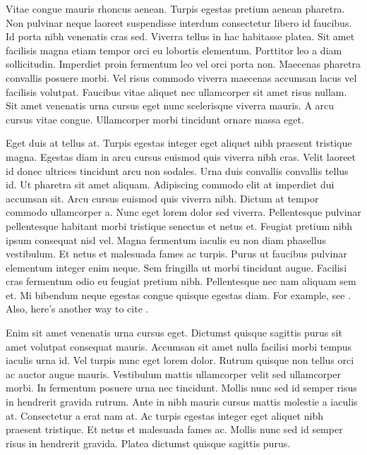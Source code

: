 Vitae congue mauris rhoncus aenean. Turpis egestas pretium aenean pharetra.
Non pulvinar neque laoreet suspendisse interdum consectetur libero id
faucibus. Id porta nibh venenatis cras sed. Viverra tellus in hac habitasse
platea. Sit amet facilisis magna etiam tempor orci eu lobortis elementum.
Porttitor leo a diam sollicitudin. Imperdiet proin fermentum leo vel orci
porta non. Maecenas pharetra convallis posuere morbi. Vel risus commodo
viverra maecenas accumsan lacus vel facilisis volutpat. Faucibus vitae
aliquet nec ullamcorper sit amet risus nullam. Sit amet venenatis urna cursus
eget nunc scelerisque viverra mauris. A arcu cursus vitae congue. Ullamcorper
morbi tincidunt ornare massa eget.
%


Eget duis at tellus at. Turpis egestas integer eget aliquet nibh praesent
tristique magna. Egestas diam in arcu cursus euismod quis viverra nibh cras.
Velit laoreet id donec ultrices tincidunt arcu non sodales. Urna duis
convallis convallis tellus id. Ut pharetra sit amet aliquam. Adipiscing
commodo elit at imperdiet dui accumsan sit. Arcu cursus euismod quis viverra
nibh. Dictum at tempor commodo ullamcorper a. Nunc eget lorem dolor sed
viverra. Pellentesque pulvinar pellentesque habitant morbi tristique senectus
et netus et. Feugiat pretium nibh ipsum consequat nisl vel. Magna fermentum
iaculis eu non diam phasellus vestibulum. Et netus et malesuada fames ac
turpis. Purus ut faucibus pulvinar elementum integer enim neque. Sem
fringilla ut morbi tincidunt augue. Facilisi cras fermentum odio eu feugiat
pretium nibh. Pellentesque nec nam aliquam sem et. Mi bibendum neque egestas
congue quisque egestas diam. For example, see \citet{fama1992cross}. Also, here's another
way to cite \citep{sharpe1964capital}.


Enim sit amet venenatis urna cursus eget. Dictumst quisque sagittis purus sit
amet volutpat consequat mauris. Accumsan sit amet nulla facilisi morbi tempus
iaculis urna id. Vel turpis nunc eget lorem dolor. Rutrum quisque non tellus
orci ac auctor augue mauris. Vestibulum mattis ullamcorper velit sed
ullamcorper morbi. In fermentum posuere urna nec tincidunt. Mollis nunc sed
id semper risus in hendrerit gravida rutrum. Ante in nibh mauris cursus
mattis molestie a iaculis at. Consectetur a erat nam at. Ac turpis egestas
integer eget aliquet nibh praesent tristique. Et netus et malesuada fames ac.
Mollis nunc sed id semper risus in hendrerit gravida. Platea dictumst quisque
sagittis purus.

